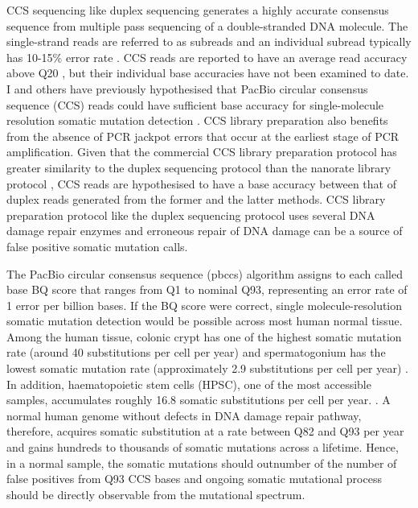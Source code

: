 CCS sequencing like duplex sequencing generates a highly accurate consensus sequence from multiple pass sequencing of a double-stranded DNA molecule. The single-strand reads are referred to as subreads and an individual subread typically has 10-15\% error rate \cite{Chaisson2012-vr}. CCS reads are reported to have an average read accuracy above Q20 \cite{Wenger2019-pw}, but their individual base accuracies have not been examined to date. I and others have previously hypothesised that PacBio circular consensus sequence (CCS) reads could have sufficient base accuracy for single-molecule resolution somatic mutation detection \cite{Salk2018-cp}. CCS library preparation also benefits from the absence of PCR jackpot errors that occur at the earliest stage of PCR amplification. Given that the commercial CCS library preparation protocol has greater similarity to the duplex sequencing protocol \cite{Schmitt2012-yr} than the nanorate library protocol \cite{Abascal2021-pk}, CCS reads are hypothesised to have a base accuracy between that of duplex reads generated from the former and the latter methods. CCS library preparation protocol like the duplex sequencing protocol uses several DNA damage repair enzymes and erroneous repair of DNA damage can be a source of false positive somatic mutation calls. 

The PacBio circular consensus sequence (pbccs) algorithm assigns to each called base BQ score that ranges from Q1 to nominal Q93, representing an error rate of 1 error per billion bases. If the BQ score were correct, single molecule-resolution somatic mutation detection would be possible across most human normal tissue. Among the human tissue, colonic crypt has one of the highest somatic mutation rate (around 40 substitutions per cell per year) \cite{Lee-Six2019-vt} and spermatogonium has the lowest somatic mutation rate (approximately 2.9 substitutions per cell per year) \cite{Rahbari2016-ot}. In addition, haematopoietic stem cells (HPSC), one of the most accessible samples, accumulates roughly 16.8 somatic substitutions per cell per year. \cite{Osorio2018-mh, Mitchell2022-ry}. A normal human genome without defects in DNA damage repair pathway, therefore, acquires somatic substitution at a rate between Q82 and Q93 per year and gains hundreds to thousands of somatic mutations across a lifetime. Hence, in a normal sample, the somatic mutations should outnumber of the number of false positives from Q93 CCS bases and ongoing somatic mutational process should be directly observable from the mutational spectrum.  

